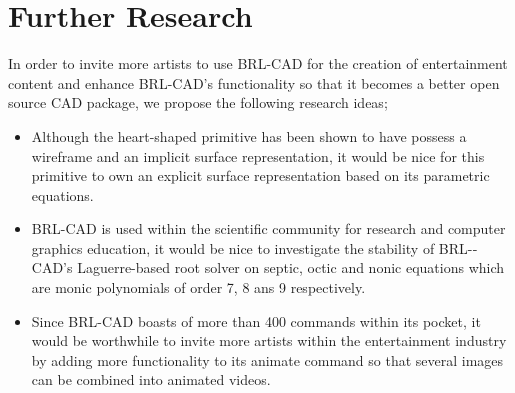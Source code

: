 
\section{Further Research}

\hspace{30} In   order   to   invite   more   artists   to   use   BRL-­CAD   for   the   creation   of  
entertainment   content   and   enhance   BRL-­CAD's   functionality   so   that   it   becomes  a 
better   open   source   CAD   package,   we   propose  the following research ideas;

\begin{itemize}
\item Although   the   heart-­shaped   primitive   has   been   shown   to   have   possess   a  
wireframe   and   an   implicit   surface   representation,   it   would   be   nice   for   this  
primitive   to   own   an   explicit   surface   representation   based   on   its   parametric  
equations.  
\item BRL­-CAD   is   used   within   the   scientific   community   for   research   and  
computer   graphics   education,   it   would   be   nice   to   investigate   the   stability  
of   BRL-­CAD's   Laguerre­-based   root   solver   on   septic,   octic   and   nonic  
equations which are monic polynomials of order 7, 8 ans 9 respectively.  
\item Since   BRL-­CAD   boasts   of   more   than   400   commands   within   its   pocket,   it  
would   be   worthwhile   to   invite   more   artists   within   the   entertainment   industry  
by   adding   more   functionality   to   its   animate   command   so   that   several  
images can be combined into animated videos.
\end{itemize}

\clearpage

